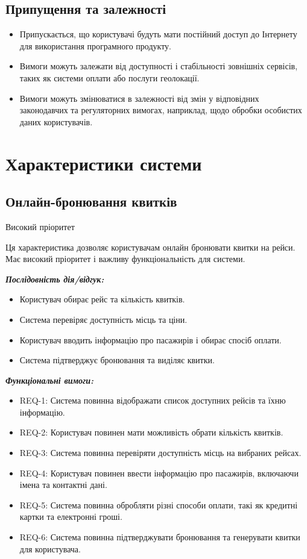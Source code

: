 \documentclass[14pt]{extreport}
\begin{document}
\begin{normalsize}
	\subsection*{Припущення та залежності}
	\begin{itemize}
		\item Припускається, що користувачі будуть мати постійний доступ до Інтернету для використання програмного продукту.
		\item Вимоги можуть залежати від доступності і стабільності зовнішніх сервісів, таких як системи оплати або послуги геолокації.
		\item Вимоги можуть змінюватися в залежності від змін у відповідних законодавчих та регуляторних вимогах, наприклад, щодо обробки особистих даних користувачів.
	\end{itemize}
	
	\section*{Характеристики системи}
	
	\subsection*{Онлайн-бронювання квитків} 
	Високий пріоритет
	
	Ця характеристика дозволяє користувачам онлайн бронювати квитки на рейси. Має високий пріоритет і важливу функціональність для системи.
	
	\textbf{\textit{Послідовність дія/відгук:}}
	\begin{itemize}
		\item Користувач обирає рейс та кількість квитків.
		\item Система перевіряє доступність місць та ціни.
		\item Користувач вводить інформацію про пасажирів і обирає спосіб оплати.
		\item Система підтверджує бронювання та виділяє квитки.
	\end{itemize}
	
	\textbf{\textit{Функціональні вимоги:}}
	\begin{itemize}
		\item REQ-1: Система повинна відображати список доступних рейсів та їхню інформацію.
		\item REQ-2: Користувач повинен мати можливість обрати кількість квитків.
		\item REQ-3: Система повинна перевіряти доступність місць на вибраних рейсах.
		\item REQ-4: Користувач повинен ввести інформацію про пасажирів, включаючи імена та контактні дані.
		\item REQ-5: Система повинна обробляти різні способи оплати, такі як кредитні картки та електронні гроші.
		\item REQ-6: Система повинна підтверджувати бронювання та генерувати квитки для користувача.
	\end{itemize}
	

\end{normalsize}
\end{document}
